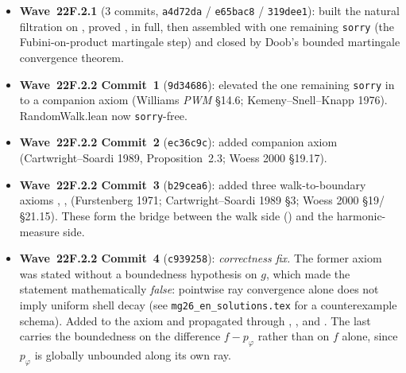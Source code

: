 \documentclass[11pt,a4paper]{article}
\newcommand{\cmd}[1]{\texttt{\small #1}}
\theoremstyle{plain}
\theoremstyle{definition}
\begin{document}
\begin{itemize}[nosep]
  \item \textbf{Wave~22F.2.1} (3 commits, \cmd{a4d72da} /
        \cmd{e65bac8} / \cmd{319dee1}): built the natural filtration
         on , proved
        ,  in full, then assembled
         with one remaining
        \cmd{sorry} (the Fubini-on-product martingale step) and
        closed  by Doob's
        bounded martingale convergence theorem.
  \item \textbf{Wave~22F.2.2 Commit~1} (\cmd{9d34686}): elevated the
        one remaining \cmd{sorry} in
         to a companion
        axiom 
        (Williams \emph{PWM} \S14.6; Kemeny--Snell--Knapp 1976).
        RandomWalk.lean now \cmd{sorry}-free.
  \item \textbf{Wave~22F.2.2 Commit~2} (\cmd{ec36c9c}): added
         companion axiom
        (Cartwright--Soardi 1989, Proposition~2.3;
        Woess 2000 \S19.17).
  \item \textbf{Wave~22F.2.2 Commit~3} (\cmd{b29cea6}): added three
        walk-to-boundary axioms
        ,
        ,
        (Furstenberg 1971; Cartwright--Soardi 1989 \S3;
        Woess 2000 \S19/\S21.15). These form the bridge between
        the walk side () and the harmonic-measure side.
  \item \textbf{Wave~22F.2.2 Commit~4} (\cmd{c939258}):
        \emph{correctness fix.} The former
         axiom was stated
        without a boundedness hypothesis on $g$, which made the
        statement mathematically \emph{false}: pointwise ray
        convergence alone does not imply uniform shell decay (see
        \texttt{mg26\_en\_solutions.tex} for a counterexample schema).
        Added  to the
        axiom and propagated through ,
        , and .
        The last carries the boundedness on the difference
        $f - p_\varphi$ rather than on $f$ alone, since $p_\varphi$ is
        globally unbounded along its own ray.

\end{itemize}
\end{document}
